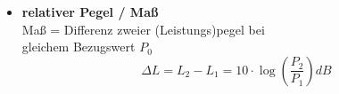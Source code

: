 \begin{itemize}
        \item \textbf{relativer Pegel / Maß}\\
        Maß = Differenz zweier (Leistungs)pegel bei\\ gleichem Bezugswert $ P_0 $
        \begin{equation*}
        	\Delta L = L_2 - L_1 = 10 \cdot \log \left( \frac{P_2}{P_1}\right)  \si{dB}
        \end{equation*}
        \end{itemize}



